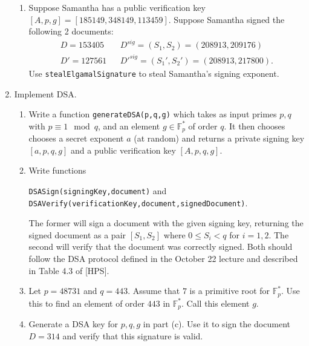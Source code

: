 \documentclass[11pt]{article}
\newcommand{\bF}{\mathbb{F}}
\begin{document}
\begin{enumerate}
{\begin{enumerate}
{    }
    \item{
    Suppose Samantha has a public verification key $[A,p,g] = [185149,348149,113459]$.  Suppose Samantha signed the following 2 documents:
    \begin{eqnarray*}
      D = 153405 && D^{sig} = (S_1,S_2) = (208913,209176)\\
      D' = 127561 && D'^{sig} = (S_1',S_2') = (208913,217800).
    \end{eqnarray*}
    Use \verb|stealElgamalSignature| to steal Samantha's signing exponent.
    }
  \end{enumerate}
  }
  \item{
  Implement DSA.
  \begin{enumerate}
    \item{
    Write a function \verb|generateDSA(p,q,g)| which takes as input primes $p,q$ with $p\equiv 1\mod q$, and an element $g\in\bF_p^*$ of order $q$.   It then chooses chooses a secret exponent $a$ (at random) and returns a private signing key $[a,p,q,g]$ and a public verification key $[A,p,q,g]$.
    }
    \item{
    Write functions \begin{center}\verb|DSASign(signingKey,document)| and \verb|DSAVerify(verificationKey,document,signedDocument)|.\end{center}
    The former will sign a document with the given signing key, returning the signed document as a pair $[S_1,S_2]$ where $0\le S_i<q$ for $i=1,2$.  The second will verify that the document was correctly signed.  Both should follow the DSA protocol defined in the October 22 lecture and described in Table 4.3 of [HPS].
    }
    \item{
    Let $p = 48731$ and $q = 443$.  Assume that $7$ is a primitive root for $\bF_p^*$.  Use this to find an element of order $443$ in $\bF_p^*$.  Call this element $g$.
    }
    \item{
    Generate a DSA key for $p,q,g$ in part (c).  Use it to sign the document $D = 314$ and verify that this signature is valid.
    }
  \end{enumerate}
  }
\end{enumerate}
\end{document}
